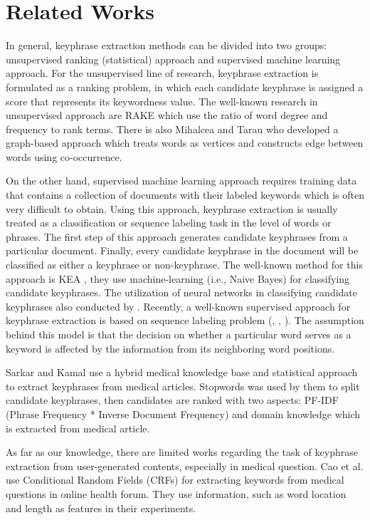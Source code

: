 \documentclass[sigconf]{acmart}
\begin{document}
	\section{Related Works}
	In general, keyphrase extraction methods can be divided into two groups: unsupervised ranking (statistical) approach and supervised machine learning approach. For the unsupervised line of research, keyphrase extraction is formulated as a ranking problem, in which each candidate keyphrase is assigned a score that represents its keywordness value. The well-known research in unsupervised approach are RAKE \cite{rake} which use the ratio of word degree and frequency to rank terms. There is also Mihalcea and Tarau \cite{mihalcea2004textrank} who developed a graph-based approach which treats words as vertices and constructs edge between words using co-occurrence.
	
	On the other hand, supervised machine learning approach requires training data that contains a collection of documents with their labeled keywords which is often very difficult to obtain. Using this approach, keyphrase extraction is usually treated as a classification or sequence labeling task in the level of words or phrases. The first step of this approach generates candidate keyphrases from a particular document. Finally, every candidate keyphrase in the document will be classified as either a keyphrase or non-keyphrase. The well-known method for this approach is KEA \cite{witten1999kea}, they use machine-learning (i.e., Naive Bayes) for classifying candidate keyphrases. The utilization of neural networks in classifying candidate keyphrases also conducted by \cite{ekpNeuralNetworks}. Recently, a well-known supervised approach for keyphrase extraction is based on sequence labeling problem (\cite{zhang2008automatic}, \cite{cao2010automatically}, \cite{zhang2016keyphrase}). The assumption behind this model is that the decision on whether a particular word serves as a keyword is affected by the information from its neighboring word positions.
	
	Sarkar and Kamal \cite{ekpMedicalDocumentHybrid} use a hybrid medical knowledge base and statistical approach to extract keyphrases from medical articles. Stopwords was used by them  to split candidate keyphrases, then candidates are ranked with two aspects: PF-IDF (Phrase Frequency * Inverse Document Frequency) and domain knowledge which is extracted from medical article.
	
	As far as our knowledge, there are limited works regarding the task of keyphrase extraction from user-generated contents, especially in medical question. Cao et al. \cite{cao2010automatically} use Conditional Random Fields (CRFs) for extracting keywords from medical questions in online health forum. They use information, such as word location and length as features in their experiments.
	
\end{document}
